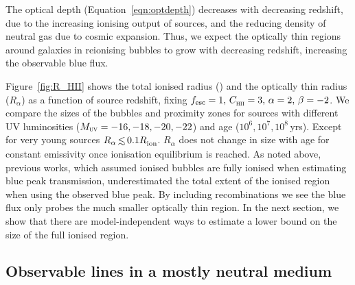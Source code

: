 \documentclass[fleqn,usenatbib]{mnras}
\begin{document}
The \lya optical depth (Equation~\ref{eqn:optdepth}) decreases with decreasing redshift, due to the increasing ionising output of sources, and the reducing density of neutral gas due to cosmic expansion. Thus, we expect the optically thin regions around galaxies in reionising bubbles to grow with decreasing redshift, increasing the observable blue flux.

Figure~\ref{fig:R_HII} shows the total ionised radius (\Rion) and the optically thin radius ($R_\alpha$) as a function of source redshift, fixing $\fesc=1, \, \clump=3, \, \alpha=2, \, \beta=-2$. We compare the sizes of the bubbles and proximity zones for sources with different UV luminosities ($\MUV = -16, -18, -20, -22$) and age ($10^6, 10^7, 10^8$\,yrs). Except for very young sources $R_\alpha \simlt 0.1\Rion$. $R_\alpha$ does not change in size with age for constant emissivity once ionisation equilibrium is reached. 
As noted above, previous works, which assumed ionised bubbles are fully ionised when estimating blue peak transmission, underestimated the total extent of the ionised region when using the observed blue \lya peak. By including recombinations we see the blue \lya flux only probes the much smaller optically thin region. In the next section, we show that there are model-independent ways to estimate a lower bound on the size of the full ionised region. 

\subsection{Observable \lya lines in a mostly neutral medium}
\label{sec:results_minDV}
\end{document}
